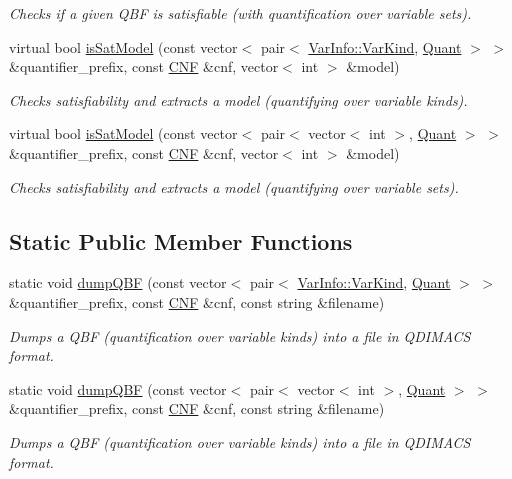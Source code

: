 \begin{DoxyCompactItemize}
\begin{DoxyCompactList}\small\item\em Checks if a given Q\-B\-F is satisfiable (with quantification over variable sets). \end{DoxyCompactList}\item 
virtual bool \hyperlink{classExtQBFSolver_ad66c53343ce9c03eea6e4b5e7753f1b3}{is\-Sat\-Model} (const vector$<$ pair$<$ \hyperlink{classVarInfo_a64d1da76cf84fe674e5fef9764ef11cf}{Var\-Info\-::\-Var\-Kind}, \hyperlink{classQBFSolver_ac091e263cb55286cc07b2451bcf4d3c7}{Quant} $>$ $>$ \&quantifier\-\_\-prefix, const \hyperlink{classCNF}{C\-N\-F} \&cnf, vector$<$ int $>$ \&model)
\begin{DoxyCompactList}\small\item\em Checks satisfiability and extracts a model (quantifying over variable kinds). \end{DoxyCompactList}\item 
virtual bool \hyperlink{classExtQBFSolver_a3add00496f016c2e60a188ce9daa1da1}{is\-Sat\-Model} (const vector$<$ pair$<$ vector$<$ int $>$, \hyperlink{classQBFSolver_ac091e263cb55286cc07b2451bcf4d3c7}{Quant} $>$ $>$ \&quantifier\-\_\-prefix, const \hyperlink{classCNF}{C\-N\-F} \&cnf, vector$<$ int $>$ \&model)
\begin{DoxyCompactList}\small\item\em Checks satisfiability and extracts a model (quantifying over variable sets). \end{DoxyCompactList}\end{DoxyCompactItemize}
\subsection*{Static Public Member Functions}
\begin{DoxyCompactItemize}
\item 
static void \hyperlink{classExtQBFSolver_abebb2acbb5afd5b205254246f39f3e33}{dump\-Q\-B\-F} (const vector$<$ pair$<$ \hyperlink{classVarInfo_a64d1da76cf84fe674e5fef9764ef11cf}{Var\-Info\-::\-Var\-Kind}, \hyperlink{classQBFSolver_ac091e263cb55286cc07b2451bcf4d3c7}{Quant} $>$ $>$ \&quantifier\-\_\-prefix, const \hyperlink{classCNF}{C\-N\-F} \&cnf, const string \&filename)
\begin{DoxyCompactList}\small\item\em Dumps a Q\-B\-F (quantification over variable kinds) into a file in Q\-D\-I\-M\-A\-C\-S format. \end{DoxyCompactList}\item 
static void \hyperlink{classExtQBFSolver_a7e329d1fdce2cf65390930b01cf3a32b}{dump\-Q\-B\-F} (const vector$<$ pair$<$ vector$<$ int $>$, \hyperlink{classQBFSolver_ac091e263cb55286cc07b2451bcf4d3c7}{Quant} $>$ $>$ \&quantifier\-\_\-prefix, const \hyperlink{classCNF}{C\-N\-F} \&cnf, const string \&filename)
\begin{DoxyCompactList}\small\item\em Dumps a Q\-B\-F (quantification over variable kinds) into a file in Q\-D\-I\-M\-A\-C\-S format. \end{DoxyCompactList}\end{DoxyCompactItemize}
